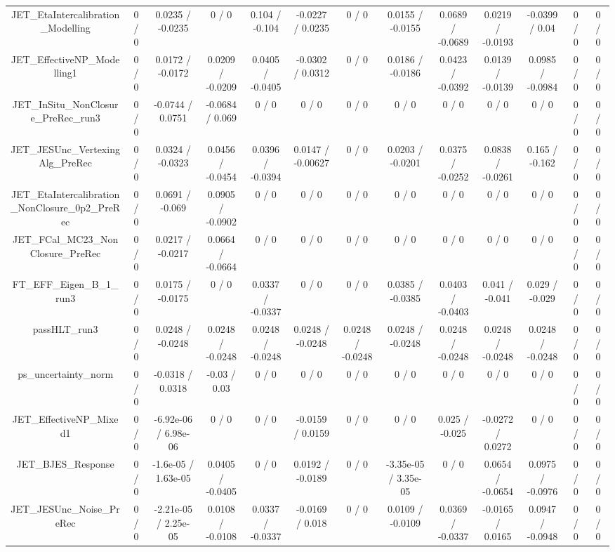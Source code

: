 \documentclass[10pt]{article}
\begin{document}
\begin{table}[htbp]
\begin{center}
\begin{tabular}{|c|c|c|c|c|c|c|c|c|c|c|c|c|}
  JET_EtaIntercalibration_Modelling & 0 / 0 & 0.0235 / -0.0235 & 0 / 0 & 0.104 / -0.104 & -0.0227 / 0.0235 & 0 / 0 & 0.0155 / -0.0155 & 0.0689 / -0.0689 & 0.0219 / -0.0193 & -0.0399 / 0.04 & 0 / 0 & 0 / 0 \\ 
  JET_EffectiveNP_Modelling1 & 0 / 0 & 0.0172 / -0.0172 & 0.0209 / -0.0209 & 0.0405 / -0.0405 & -0.0302 / 0.0312 & 0 / 0 & 0.0186 / -0.0186 & 0.0423 / -0.0392 & 0.0139 / -0.0139 & 0.0985 / -0.0984 & 0 / 0 & 0 / 0 \\ 
  JET_InSitu_NonClosure_PreRec_run3 & 0 / 0 & -0.0744 / 0.0751 & -0.0684 / 0.069 & 0 / 0 & 0 / 0 & 0 / 0 & 0 / 0 & 0 / 0 & 0 / 0 & 0 / 0 & 0 / 0 & 0 / 0 \\ 
  JET_JESUnc_VertexingAlg_PreRec & 0 / 0 & 0.0324 / -0.0323 & 0.0456 / -0.0454 & 0.0396 / -0.0394 & 0.0147 / -0.00627 & 0 / 0 & 0.0203 / -0.0201 & 0.0375 / -0.0252 & 0.0838 / -0.0261 & 0.165 / -0.162 & 0 / 0 & 0 / 0 \\ 
  JET_EtaIntercalibration_NonClosure_0p2_PreRec & 0 / 0 & 0.0691 / -0.069 & 0.0905 / -0.0902 & 0 / 0 & 0 / 0 & 0 / 0 & 0 / 0 & 0 / 0 & 0 / 0 & 0 / 0 & 0 / 0 & 0 / 0 \\ 
  JET_FCal_MC23_NonClosure_PreRec & 0 / 0 & 0.0217 / -0.0217 & 0.0664 / -0.0664 & 0 / 0 & 0 / 0 & 0 / 0 & 0 / 0 & 0 / 0 & 0 / 0 & 0 / 0 & 0 / 0 & 0 / 0 \\ 
  FT_EFF_Eigen_B_1_run3 & 0 / 0 & 0.0175 / -0.0175 & 0 / 0 & 0.0337 / -0.0337 & 0 / 0 & 0 / 0 & 0.0385 / -0.0385 & 0.0403 / -0.0403 & 0.041 / -0.041 & 0.029 / -0.029 & 0 / 0 & 0 / 0 \\ 
  passHLT_run3 & 0 / 0 & 0.0248 / -0.0248 & 0.0248 / -0.0248 & 0.0248 / -0.0248 & 0.0248 / -0.0248 & 0.0248 / -0.0248 & 0.0248 / -0.0248 & 0.0248 / -0.0248 & 0.0248 / -0.0248 & 0.0248 / -0.0248 & 0 / 0 & 0 / 0 \\ 
  ps_uncertainty_norm & 0 / 0 & -0.0318 / 0.0318 & -0.03 / 0.03 & 0 / 0 & 0 / 0 & 0 / 0 & 0 / 0 & 0 / 0 & 0 / 0 & 0 / 0 & 0 / 0 & 0 / 0 \\ 
  JET_EffectiveNP_Mixed1 & 0 / 0 & -6.92e-06 / 6.98e-06 & 0 / 0 & 0 / 0 & -0.0159 / 0.0159 & 0 / 0 & 0 / 0 & 0.025 / -0.025 & -0.0272 / 0.0272 & 0 / 0 & 0 / 0 & 0 / 0 \\ 
  JET_BJES_Response & 0 / 0 & -1.6e-05 / 1.63e-05 & 0.0405 / -0.0405 & 0 / 0 & 0.0192 / -0.0189 & 0 / 0 & -3.35e-05 / 3.35e-05 & 0 / 0 & 0.0654 / -0.0654 & 0.0975 / -0.0976 & 0 / 0 & 0 / 0 \\ 
  JET_JESUnc_Noise_PreRec & 0 / 0 & -2.21e-05 / 2.25e-05 & 0.0108 / -0.0108 & 0.0337 / -0.0337 & -0.0169 / 0.018 & 0 / 0 & 0.0109 / -0.0109 & 0.0369 / -0.0337 & -0.0165 / 0.0165 & 0.0947 / -0.0948 & 0 / 0 & 0 / 0 \\ 

\end{tabular}
\end{center}
\end{table}
\end{document}
